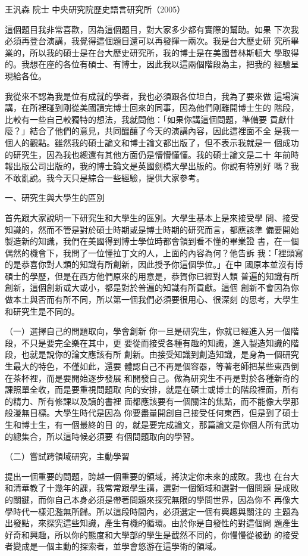 王汎森 院士
中央研究院歷史語言研究所（2005）

這個題目我非常喜歡，因為這個題目，對大家多少都有實際的幫助。如果
下次我必須再登台演講，我覺得這個題目還可以再發揮一兩次。我是台大歷史研
究所畢業的，所以我的碩士是在台大歷史研究所，我的博士是在美國普林斯頓大
學取得的。我想在座的各位有碩士、有博士，因此我以這兩個階段為主，把我的
經驗呈現給各位。



我從來不認為我是位有成就的學者，我也必須跟各位坦白，我為了要來做
這場演講，在所裡碰到剛從美國讀完博士回來的同事，因為他們剛離開博士生的
階段，比較有一些自己較獨特的想法，我就問他：「如果你講這個問題，準備要
貢獻什麼？」結合了他們的意見，共同醞釀了今天的演講內容，因此這裡面不全
是我一個人的觀點。雖然我的碩士論文和博士論文都出版了，但不表示我就是一
個成功的研究生，因為我也總還有其他方面仍是懵懵懂懂。我的碩士論文是二十
年前時報出版公司出版的，我的博士論文是英國劍橋大學出版的。你說有特別好
嗎？我不敢亂說。我今天只是綜合一些經驗，提供大家參考。

一、研究生與大學生的區別

首先跟大家說明一下研究生和大學生的區別。大學生基本上是來接受學
問、接受知識的，然而不管是對於碩士時期或是博士時期的研究而言，都應該準
備要開始製造新的知識，我們在美國得到博士學位時都會領到看不懂的畢業證
書，在一個偶然的機會下，我問了一位懂拉丁文的人，上面的內容為何？他告訴
我：「裡頭寫的是恭喜你對人類的知識有所創新，因此授予你這個學位。」在中
國原本並沒有博碩士的學歷，但是在西方他們原來的用意是，恭賀你已經對人類
普遍的知識有所創新，這個創新或大或小，都是對於普遍的知識有所貢獻。這個
創新不會因為你做本土與否而有所不同，所以第一個我們必須要很用心、很深刻
的思考，大學生和研究生是不同的。

（一）選擇自己的問題取向，學會創新
你一旦是研究生，你就已經進入另一個階段，不只是要完全樂在其中，更
要從而接受各種有趣的知識，進入製造知識的階段，也就是說你的論文應該有所
創新。由接受知識到創造知識，是身為一個研究生最大的特色，不僅如此，還要
體認自己不再是個容器，等著老師把某些東西倒在茶杯裡，而是要開始逐步發展
和開發自己。做為研究生不再是對於各種新奇的課照單全收，而是要重視問題取
向的安排，就是在碩士或博士的階段裡面，所有的精力、所有修課以及讀的書裡
面都應該要有一個關注的焦點，而不能像大學那般漫無目標。大學生時代是因為
你要盡量開創自己接受任何東西，但是到了碩士生和博士生，有一個最終的目
的，就是要完成論文，那篇論文是你個人所有武功的總集合，所以這時候必須要
有個問題取向的學習。


（二）嘗試跨領域研究，主動學習

提出一個重要的問題，跨越一個重要的領域，將決定你未來的成敗。我也
在台大和清華教了十幾年的課，我常常跟學生講，選對一個領域和選對一個問題
是成敗的關鍵，而你自己本身必須是帶著問題來探究無限的學問世界，因為你不
再像大學時代一樣氾濫無所歸。所以這段時間內，必須選定一個有興趣與關注的
主題為出發點，來探究這些知識，產生有機的循環。由於你是自發性的對這個問
題產生好奇和興趣，所以你的態度和大學部的學生是截然不同的，你慢慢從被動
的接受者變成是一個主動的探索者，並學會悠游在這學術的領域。

